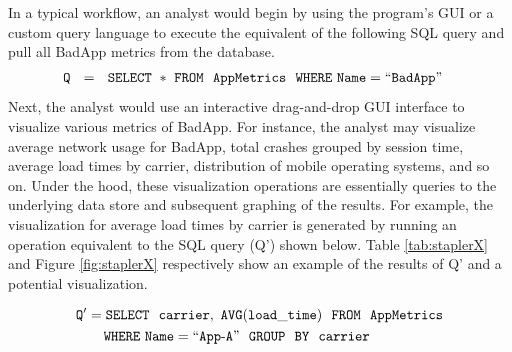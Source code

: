 In a typical workflow, an analyst would begin by using the program's GUI or a custom query language to execute the equivalent
of the following SQL query and pull all BadApp metrics from the database. 
\noindent 
\begin{align*}
& \tt Q \ \ = \ \ SELECT \ * \ FROM \ \  AppMetrics \ \ WHERE  \ Name=``BadApp"
\end{align*}
Next, the analyst would use an interactive drag-and-drop GUI interface to visualize various metrics of BadApp.
For instance, the analyst may visualize average network usage for BadApp, total crashes grouped by session time,
average load times by carrier, distribution of mobile operating systems, and so on.
Under the hood, these visualization operations are essentially queries to the underlying data store and subsequent graphing of 
the results.
For example, the visualization for average load times by carrier is generated by running an operation equivalent to the
SQL query (Q') shown below.
Table \ref{tab:staplerX} and Figure \ref{fig:staplerX} respectively show an example of the results of Q' and a potential
visualization.

\noindent
\begin{align*}
& \tt Q' = SELECT \ \ carrier,\ AVG(load\_time) \ \ FROM \ \  AppMetrics \\
& \tt \hspace{20pt} WHERE\ Name=``App\text{-}A" \ \ GROUP  \ \ BY \ \ carrier
\end{align*}

